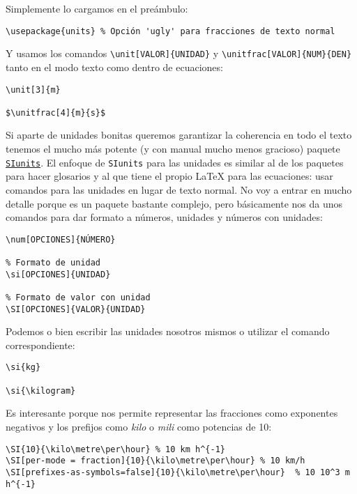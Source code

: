Simplemente lo cargamos en el preámbulo:

\begin{lstlisting}[language={[latex]tex}]
\usepackage{units} % Opción 'ugly' para fracciones de texto normal
\end{lstlisting}

Y usamos los comandos \lstinline!\unit[VALOR]{UNIDAD}! y
\lstinline!\unitfrac[VALOR]{NUM}{DEN}! tanto en el modo texto como
dentro de ecuaciones:

\begin{lstlisting}[language={[latex]tex}]
\unit[3]{m}

$\unitfrac[4]{m}{s}$
\end{lstlisting}

Si aparte de unidades bonitas queremos garantizar la coherencia en todo
el texto tenemos el mucho más potente (y con manual mucho menos
gracioso) paquete
\href{http://ctan.org/pkg/siunitx}{\lstinline!SIunits!}. El enfoque de
\lstinline!SIunits! para las unidades es similar al de los paquetes para
hacer glosarios y al que tiene el propio LaTeX para las ecuaciones: usar
comandos para las unidades en lugar de texto normal. No voy a entrar en
mucho detalle porque es un paquete bastante complejo, pero básicamente
nos da unos comandos para dar formato a números, unidades y números con
unidades:

\begin{lstlisting}[language={[latex]tex}]
% Formato de número
\num[OPCIONES]{NÚMERO}

% Formato de unidad
\si[OPCIONES]{UNIDAD}

% Formato de valor con unidad
\SI[OPCIONES]{VALOR}{UNIDAD}
\end{lstlisting}

Podemos o bien escribir las unidades nosotros mismos o utilizar el
comando correspondiente:

\begin{lstlisting}[language={[latex]tex}]
\si{kg}

\si{\kilogram}
\end{lstlisting}

Es interesante porque nos permite representar las fracciones como
exponentes negativos y los prefijos como \emph{kilo} o \emph{mili} como
potencias de 10:

\begin{lstlisting}[language={[latex]tex}]
\SI{10}{\kilo\metre\per\hour} % 10 km h^{-1}
\SI[per-mode = fraction]{10}{\kilo\metre\per\hour} % 10 km/h
\SI[prefixes-as-symbols=false]{10}{\kilo\metre\per\hour}  % 10 10^3 m h^{-1}
\end{lstlisting}


